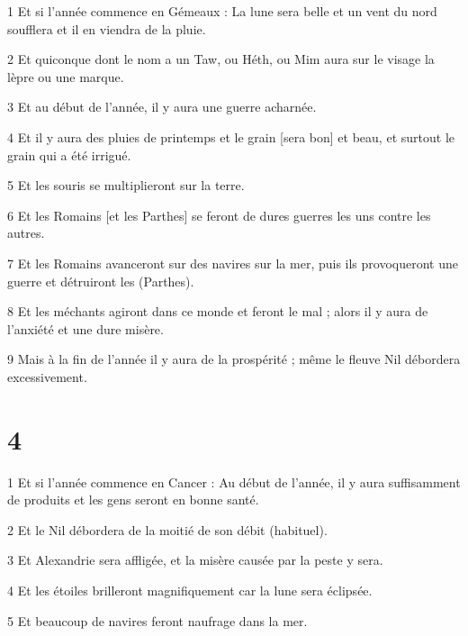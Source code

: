\par 1 Et si l'année commence en Gémeaux : La lune sera belle et un vent du nord soufflera et il en viendra de la pluie.

\par 2 Et quiconque dont le nom a un Taw, ou Héth, ou Mim aura sur le visage la lèpre ou une marque.

\par 3 Et au début de l'année, il y aura une guerre acharnée.

\par 4 Et il y aura des pluies de printemps et le grain [sera bon] et beau, et surtout le grain qui a été irrigué.

\par 5 Et les souris se multiplieront sur la terre.

\par 6 Et les Romains [et les Parthes] se feront de dures guerres les uns contre les autres.

\par 7 Et les Romains avanceront sur des navires sur la mer, puis ils provoqueront une guerre et détruiront les (Parthes).

\par 8 Et les méchants agiront dans ce monde et feront le mal ; alors il y aura de l’anxiété et une dure misère.

\par 9 Mais à la fin de l'année il y aura de la prospérité ; même le fleuve Nil débordera excessivement.

\chapter{4}

\par 1 Et si l'année commence en Cancer : Au début de l'année, il y aura suffisamment de produits et les gens seront en bonne santé.

\par 2 Et le Nil débordera de la moitié de son débit (habituel).

\par 3 Et Alexandrie sera affligée, et la misère causée par la peste y sera.

\par 4 Et les étoiles brilleront magnifiquement car la lune sera éclipsée.

\par 5 Et beaucoup de navires feront naufrage dans la mer.

